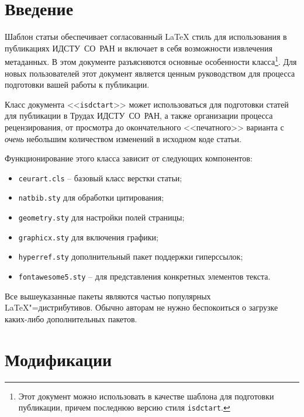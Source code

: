 \documentclass[
12pt,
polyglossia,   %
firacode,    %
wordmath,      %
russian        %
]{isdctart}
\begin{document}

\maketitle

\section{Введение}


Шаблон статьи обеспечивает согласованный \LaTeX{} стиль для использования в публикациях ИДСТУ~СО~РАН и включает в себя возможности извлечения метаданных. В этом документе разъясняются основные особенности класса\footnote{Этот документ можно использовать в качестве шаблона для подготовки публикации, причем последнюю версию стиля \texttt{isdctart}.}. Для новых пользователей этот документ является ценным руководством для процесса подготовки вашей работы к публикации.

Класс документа <<\verb|isdctart|>> может использоваться для подготовки статей для публикации в Трудах ИДСТУ~СО~РАН, а также организации процесса рецензирования, от просмотра до окончательного <<печатного>> варианта с {\itshape очень} небольшим количеством изменений в исходном коде статьи.

Функционирование этого класса зависит от следующих компонентов:
\begin{itemize}
\item \verb|ceurart.cls| -- базовый класс верстки статьи;
\item \verb|natbib.sty| для обработки цитирования;
\item \verb|geometry.sty| для настройки полей страницы;
\item \verb|graphicx.sty| для включения графики;
\item \verb|hyperref.sty| дополнительный пакет поддержки гиперссылок;
\item \verb|fontawesome5.sty| -- для представления конкретных элементов текста.
\end{itemize}

Все вышеуказанные пакеты являются частью популярных \LaTeX{}"=дистрибутивов. Обычно авторам не нужно беспокоиться о загрузке каких-либо дополнительных пакетов.

\section{Модификации}
\end{document}

